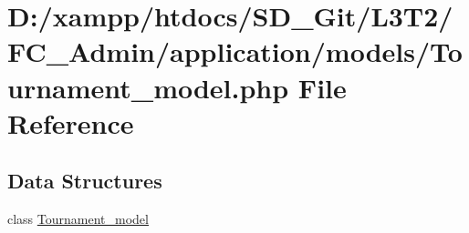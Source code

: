 \hypertarget{_admin_2application_2models_2_tournament__model_8php}{}\section{D\+:/xampp/htdocs/\+S\+D\+\_\+\+Git/\+L3\+T2/\+F\+C\+\_\+\+Admin/application/models/\+Tournament\+\_\+model.php File Reference}
\label{_admin_2application_2models_2_tournament__model_8php}
\subsection*{Data Structures}
\begin{DoxyCompactItemize}
\item 
class \hyperlink{class_tournament__model}{Tournament\+\_\+model}
\end{DoxyCompactItemize}
